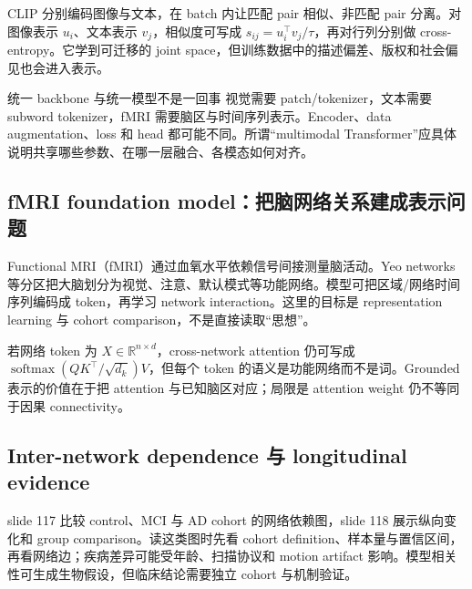 CLIP 分别编码图像与文本，在 batch 内让匹配 pair 相似、非匹配 pair 分离。对图像表示 $u_i$、文本表示 $v_j$，相似度可写成 $s_{ij}=u_i^{\top}v_j/\tau$，再对行列分别做 cross-entropy。它学到可迁移的 joint space，但训练数据中的描述偏差、版权和社会偏见也会进入表示。



\begin{importantbox}{统一 backbone 与统一模型不是一回事}
视觉需要 patch/tokenizer，文本需要 subword tokenizer，fMRI 需要脑区与时间序列表示。Encoder、data augmentation、loss 和 head 都可能不同。所谓“multimodal Transformer”应具体说明共享哪些参数、在哪一层融合、各模态如何对齐。
\end{importantbox}

\subsection{fMRI foundation model：把脑网络关系建成表示问题}

Functional MRI（fMRI）通过血氧水平依赖信号间接测量脑活动。Yeo networks 等分区把大脑划分为视觉、注意、默认模式等功能网络。模型可把区域/网络时间序列编码成 token，再学习 network interaction。这里的目标是 representation learning 与 cohort comparison，不是直接读取“思想”。



若网络 token 为 $X\in\mathbb{R}^{n\times d}$，cross-network attention 仍可写成 $\operatorname{softmax}(QK^\top/\sqrt{d_k})V$，但每个 token 的语义是功能网络而不是词。Grounded 表示的价值在于把 attention 与已知脑区对应；局限是 attention weight 仍不等同于因果 connectivity。

\subsection{Inter-network dependence 与 longitudinal evidence}

slide 117 比较 control、MCI 与 AD cohort 的网络依赖图，slide 118 展示纵向变化和 group comparison。读这类图时先看 cohort definition、样本量与置信区间，再看网络边；疾病差异可能受年龄、扫描协议和 motion artifact 影响。模型相关性可生成生物假设，但临床结论需要独立 cohort 与机制验证。

